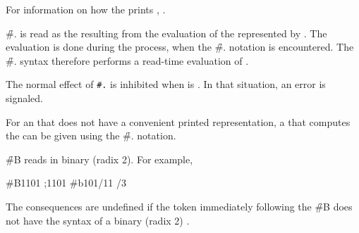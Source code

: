For information on how the  
prints  ,
\seesection\PrintingSymbols.

\endsubsubsection%



\f{\#.} is read as the  resulting from the evaluation
of the  represented by .
The evaluation is done during the  process,
when the \f{\#.} notation is encountered.
The \f{\#.} syntax therefore performs a read-time evaluation of .

The normal effect of {\tt \#.} is inhibited when  is .
In that situation, an error  is signaled.

For an 
that does not have a convenient printed
representation, a  that computes the  can be given using
the \f{\#.} notation.
%

\endsubsubsection%




\f{\#B} reads  in binary (radix 2).
For example, 

\code
 #B1101  ;1101\ssst
 #b101/11 /3
\endcode

The consequences are undefined if the token immediately following
the \f{\#B} does not have the syntax of a binary (\ie radix 2) .

